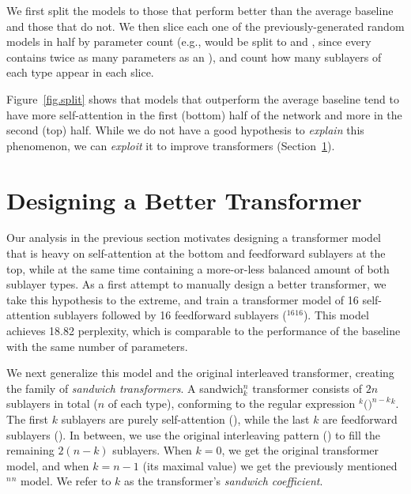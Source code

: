 \documentclass[11pt,a4paper]{article}
\begin{document}
We first split the models to those that perform better than the average baseline and those that do not.
We then slice each one of the previously-generated random models in half by parameter count (e.g., {\Large \texttt{}} would be split to {\Large \texttt{}} and {\Large \texttt{}}, since every {\Large \texttt{}} contains twice as many parameters as an {\Large \texttt{}}), and count how many sublayers of each type appear in each slice.

Figure~\ref{fig.split} shows that models that outperform the average baseline tend to have more self-attention {\Large \texttt{}} in the first (bottom) half of the network and more {\Large \texttt{}} in the second (top) half.
While we do not have a good hypothesis to \emph{explain} this phenomenon, we can \emph{exploit} it to improve transformers (Section~\ref{sec.designing}).




 \section{Designing a Better Transformer} \label{sec.designing}

Our analysis in the previous section motivates designing a transformer model that is heavy on self-attention at the bottom and feedforward sublayers at the top, while at the same time containing a more-or-less balanced amount of both sublayer types.
As a first attempt to manually design a better transformer, we take this hypothesis to the extreme, and train a transformer model of 16 self-attention sublayers followed by 16 feedforward sublayers ({\Large \texttt{}}$^{16}${\Large \texttt{}}$^{16}$). This model achieves 18.82 perplexity, which is comparable to the performance of the baseline with the same number of parameters.

We next generalize this model and the original interleaved transformer, creating the family of \emph{sandwich transformers}.
A sandwich$^n_k$ transformer consists of $2n$ sublayers in total ($n$ of each type), conforming to the regular expression {\Large \texttt{}}$^k(${\Large \texttt{}}$)^{n-k}$$^k$. The first $k$ sublayers are purely self-attention ({\Large \texttt{}}), while the last $k$ are feedforward sublayers ({\Large \texttt{}}). In between, we use the original interleaving pattern ({\Large \texttt{}}) to fill the remaining $2(n-k)$ sublayers. When $k=0$, we get the original transformer model, and when $k=n-1$ (its maximal value) we get the previously mentioned {\Large \texttt{}}$^{n}${\Large \texttt{}}$^{n}$ model. We refer to $k$ as the transformer's \emph{sandwich coefficient}. 
\end{document}
